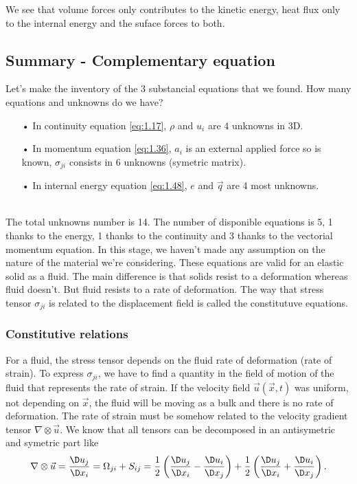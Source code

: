 		\begin{center}
		\end{center}
		We see that volume forces only contributes to the kinetic energy, heat flux only to the internal energy and the suface forces to both. 
		
	\subsection{Summary - Complementary equation}
		Let's make the inventory of the 3 substancial equations that we found. How many equations and unknowns do we have? 
	\begin{itemize}
		\item[•] In continuity equation \eqref{eq:1.17}, $\rho$ and $u_i$ are 4 unknowns in 3D. 
		\item[•] In momentum equation \eqref{eq:1.36}, $a_i$ is an external applied force so is known, $\sigma _{ji}$ consists in 6 unknowns (symetric matrix).
		\item[•] In internal energy equation \eqref{eq:1.48}, $e$ and $\vec{q}$ are 4 most unknowns. 
	\end{itemize}			
	\ \\
	The total unknowns number is 14.  The number of disponible equations is 5, 1 thanks to the energy, 1 thanks to the continuity and 3 thanks to the vectorial momentum equation. In this stage, we haven't made any assumption on the nature of the material we're considering. These equations are valid for an elastic solid as a fluid. The main difference is that solids resist to a deformation whereas fluid doesn't. But fluid resists to a rate of deformation. The way that stress tensor $\sigma _{ji}$ is related to the displacement field is called the constitutuve equations. 
	
	\subsubsection{Constitutive relations} 
		For a fluid, the stress tensor depends on the fluid rate of deformation (rate of strain). To express $\sigma _{ji}$, we have to find a quantity in the field of motion of the fluid that represents the rate of strain. If the velocity field $\vec{u}(\vec{x},t)$ was uniform, not depending on $\vec{x}$, the fluid will be moving as a bulk and there is no rate of deformation. The rate of strain must be somehow related to the velocity gradient tensor $\nabla \otimes \vec{u}$. We know that all tensors can be decomposed in an antisymetric and symetric part like 
		\begin{equation}
			\nabla \otimes \vec{u} = \frac{\D u_j}{\D x_i} = \Omega _{ji} + S _{ij} = \frac{1}{2} \left( \frac{\D u_j}{\D x_i} - \frac{\D u_i}{\D x_j} \right) + \frac{1}{2} \left( \frac{\D u_j}{\D x_i} + \frac{\D u_i}{\D x_j} \right).
		\end{equation}
		

